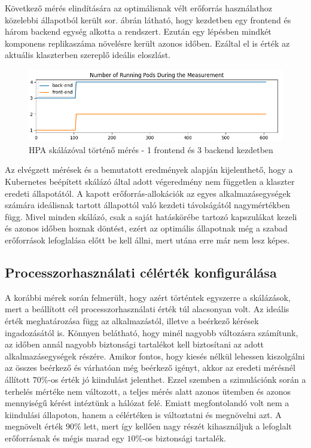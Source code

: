 Következő mérés elindítására az optimálisnak vélt erőforrás használathoz közelebbi állapotból került sor.
 ábrán látható, hogy kezdetben egy frontend és három backend egység alkotta a rendszert. 
Ezután egy lépésben mindkét komponens replikaszáma növelésre került azonos időben.
Ezáltal el is érték az aktuális klaszterben szereplő ideális eloszlást.

\begin{figure}[!ht]
	\centering
	\includegraphics[width=150mm, keepaspectratio]{figures/HPA-scaling-from-1FE-3BE.png}
	\caption{HPA skálázóval történő mérés - 1 frontend és 3 backend kezdetben}
	\label{fig:HPA-scaling-from-1FE-3BE}
\end{figure}

Az elvégzett mérések és a bemutatott eredmények alapján kijelenthető, hogy a Kubernetes beépített skálázó által adott végeredmény nem független a klaszter eredeti állapotától.
A kapott erőforrás-allokációk az egyes alkalmazásegységek számára ideálisnak tartott állapottól való kezdeti távolságától nagymértékben függ.
Mivel minden skálázó, csak a saját hatáskörébe tartozó kapszulákat kezeli és azonos időben hoznak döntést, ezért az optimális állapotnak még a szabad erőforrások lefoglalása előtt be kell állni, mert utána erre már nem lesz képes.


\subsection{Processzorhasználati célérték konfigurálása}
A korábbi mérek során felmerült, hogy azért történtek egyszerre a skálázások, mert a beállított cél processzorhasználati érték túl alacsonyan volt.
Az ideális érték meghatározása függ az alkalmazástól, illetve a beérkező kérések ingadozásától is.
Könnyen belátható, hogy minél nagyobb változásra számítunk, az időben annál nagyobb biztonsági tartalékot kell biztosítani az adott alkalmazásegységek részére.
Amikor fontos, hogy kiesés nélkül lehessen kiszolgálni az összes beérkező és várhatóan még beérkező igényt, akkor az eredeti mérésnél állított $70\%$-os érték jó kiindulást jelenthet.
Ezzel szemben a szimulációnk során a terhelés mértéke nem változott, a teljes mérés alatt azonos ütemben és azonos mennyiségű kérést intéztünk a hálózat felé.
Emiatt megfontolandó volt nem a kiindulási állapoton, hanem a célértéken is változtatni és megnövelni azt.
A megnövelt érték $90\%$ lett, mert így kellően nagy részét kihasználjuk a lefoglalt erőforrásnak és mégis marad egy $10\%$-os biztonsági tartalék.

